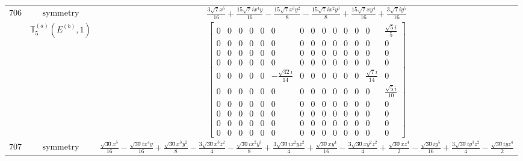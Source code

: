 \documentclass[fleqn,8pt,landscape]{jsarticle}
\begin{document}
\begin{longtable}{ccc}
$ 706 $ & $ \text{symmetry} $ & $ \frac{3 \sqrt{7} x^{5}}{16} + \frac{15 \sqrt{7} i x^{4} y}{16} - \frac{15 \sqrt{7} x^{3} y^{2}}{8} - \frac{15 \sqrt{7} i x^{2} y^{3}}{8} + \frac{15 \sqrt{7} x y^{4}}{16} + \frac{3 \sqrt{7} i y^{5}}{16} $ \\
$  $ & $ \mathbb{T}_{5}^{(a)}(E^{(b)},1) $ & $ \begin{bmatrix} 0 & 0 & 0 & 0 & 0 & 0 & 0 & 0 & 0 & 0 & 0 & 0 & 0 & \frac{\sqrt{5} i}{5} \\ 0 & 0 & 0 & 0 & 0 & 0 & 0 & 0 & 0 & 0 & 0 & 0 & 0 & 0 \\ 0 & 0 & 0 & 0 & 0 & 0 & 0 & 0 & 0 & 0 & 0 & 0 & 0 & 0 \\ 0 & 0 & 0 & 0 & 0 & 0 & 0 & 0 & 0 & 0 & 0 & 0 & 0 & 0 \\ 0 & 0 & 0 & 0 & 0 & - \frac{\sqrt{42} i}{14} & 0 & 0 & 0 & 0 & 0 & 0 & \frac{\sqrt{7} i}{14} & 0 \\ 0 & 0 & 0 & 0 & 0 & 0 & 0 & 0 & 0 & 0 & 0 & 0 & 0 & \frac{\sqrt{5} i}{10} \\ 0 & 0 & 0 & 0 & 0 & 0 & 0 & 0 & 0 & 0 & 0 & 0 & 0 & 0 \\ 0 & 0 & 0 & 0 & 0 & 0 & 0 & 0 & 0 & 0 & 0 & 0 & 0 & 0 \\ 0 & 0 & 0 & 0 & 0 & 0 & 0 & 0 & 0 & 0 & 0 & 0 & 0 & 0 \\ 0 & 0 & 0 & 0 & 0 & 0 & 0 & 0 & 0 & 0 & 0 & 0 & 0 & 0 \end{bmatrix} $ \\ \hline
$ 707 $ & $ \text{symmetry} $ & $ \frac{\sqrt{30} x^{5}}{16} - \frac{\sqrt{30} i x^{4} y}{16} + \frac{\sqrt{30} x^{3} y^{2}}{8} - \frac{3 \sqrt{30} x^{3} z^{2}}{4} - \frac{\sqrt{30} i x^{2} y^{3}}{8} + \frac{3 \sqrt{30} i x^{2} y z^{2}}{4} + \frac{\sqrt{30} x y^{4}}{16} - \frac{3 \sqrt{30} x y^{2} z^{2}}{4} + \frac{\sqrt{30} x z^{4}}{2} - \frac{\sqrt{30} i y^{5}}{16} + \frac{3 \sqrt{30} i y^{3} z^{2}}{4} - \frac{\sqrt{30} i y z^{4}}{2} $ \\

\end{longtable}
\end{document}
